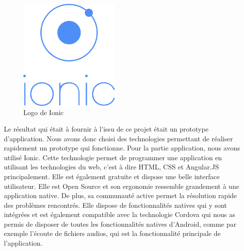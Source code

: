 \documentclass[pidr]{tnreport}
\begin{document}
\begin{figure}
  \centering
  \includegraphics[width=5cm]{figures/ionic}
  \caption{Logo de Ionic}
  \label{fig:logo-ionic}
\end{figure}
Le résultat qui était à fournir à l’issu de ce projet était un prototype d’application. Nous avons donc choisi des technologies permettant de réaliser rapidement un prototype qui fonctionne. Pour la partie application, nous avons utilisé Ionic. Cette technologie permet de programmer une application en utilisant les technologies du web, c’est à dire HTML, CSS et Angular.JS principalement. Elle est également gratuite et dispose une belle interface utilisateur. Elle est Open Source et son ergonomie ressemble grandement à une application native. De plus, sa communauté active permet la résolution rapide des problèmes rencontrés. Elle dispose de fonctionnalités natives qui y sont intégrées et est également compatible avec la technologie Cordova qui nous as permis de disposer de toutes les fonctionnalités natives d’Android, comme par exemple l’écoute de fichiers audios, qui est la fonctionnalité principale de l’application.
\end{document}
